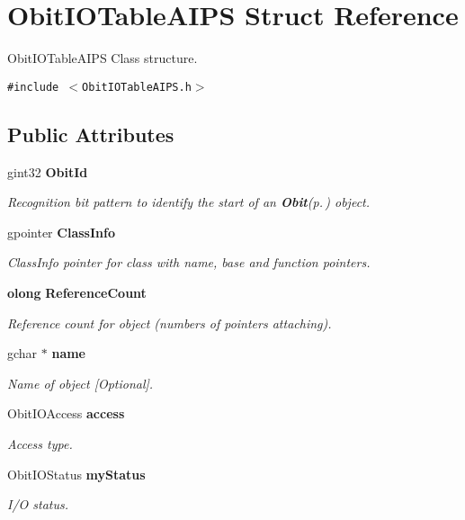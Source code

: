 \section{Obit\-IOTable\-AIPS Struct Reference}
\label{structObitIOTableAIPS}
Obit\-IOTable\-AIPS Class structure.  


{\tt \#include $<$Obit\-IOTable\-AIPS.h$>$}

\subsection*{Public Attributes}
\begin{CompactItemize}
\item 
gint32 {\bf Obit\-Id}
\begin{CompactList}\small\item\em Recognition bit pattern to identify the start of an {\bf Obit}{\rm (p.\,\pageref{structObit})} object. \item\end{CompactList}\item 
gpointer {\bf Class\-Info}
\begin{CompactList}\small\item\em Class\-Info pointer for class with name, base and function pointers. \item\end{CompactList}\item 
{\bf olong} {\bf Reference\-Count}
\begin{CompactList}\small\item\em Reference count for object (numbers of pointers attaching). \item\end{CompactList}\item 
gchar $\ast$ {\bf name}
\begin{CompactList}\small\item\em Name of object [Optional]. \item\end{CompactList}\item 
Obit\-IOAccess {\bf access}
\begin{CompactList}\small\item\em Access type. \item\end{CompactList}\item 
Obit\-IOStatus {\bf my\-Status}
\begin{CompactList}\small\item\em I/O status. \item\end{CompactList}\item 

\end{CompactItemize}
